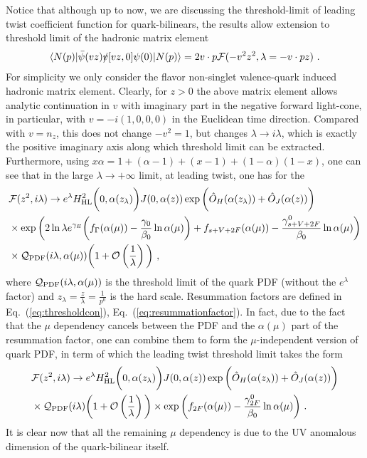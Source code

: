 \documentclass[a4paper,11pt]{article}
\begin{document}
Notice that although up to now, we are discussing the threshold-limit of leading twist coefficient function for quark-bilinears, the results allow extension to threshold limit of the hadronic matrix element~\cite{Braun:2018brg} \begin{align}
\langle N(p)|\bar \psi(vz)\slashed{v}[vz,0]\psi(0)|N(p)\rangle=2v\cdot p {\cal F}(-v^2z^2,\lambda=-v\cdot p z) \ .
\end{align}
For simplicity we only consider the flavor non-singlet valence-quark induced hadronic matrix element. Clearly, for $z>0$ the above matrix element allows analytic continuation in $v$ with imaginary part in the negative forward light-cone, in particular, with $v=-i(1,0,0,0)$ in the Euclidean time direction. Compared with $v=n_z$, this does not change $-v^2=1$, but changes $\lambda \rightarrow i\lambda$, which is exactly the positive imaginary axis along which threshold limit can be extracted. Furthermore, using $x\alpha=1+(\alpha-1)+(x-1)+(1-\alpha)(1-x)$, one can see that in the large $\lambda \rightarrow +\infty$ limit, at leading twist, one has for the 
\begin{align}
&{\cal F}(z^2,i\lambda) \rightarrow e^{\lambda}H_{\rm HL}^2\bigg(0,\alpha(z_\lambda)\bigg)J(0,\alpha(z))\exp \bigg(\hat O_H(\alpha(z_\lambda))+\hat O_J(\alpha(z))\bigg) \nonumber \\ 
& \times \exp \bigg(2\ln \lambda e^{\gamma_E}\bigg(f_{\Gamma}(\alpha(\mu))-\frac{\gamma_0}{\beta_0}\ln \alpha(\mu)\bigg)+f_{s+V+2F}(\alpha(\mu))-\frac{\gamma^0_{s+V+2F}}
{\beta_0}\ln \alpha(\mu)\bigg) \nonumber \\ 
& \times {\cal Q}_{\rm PDF}(i\lambda,\alpha(\mu))\bigg(1+{\cal O} \left(\frac{1}{\lambda}\right)\bigg) \ ,
\end{align}
where ${\cal Q}_{\rm PDF}(i\lambda,\alpha(\mu))$ is the threshold limit of the quark PDF (without the $e^{\lambda}$ factor) and $z_\lambda=\frac{z}{\lambda}=\frac{1}{p^0}$ is the hard scale. Resummation factors are defined in Eq.~(\ref{eq:thresholdcon}), Eq.~(\ref{eq:resummationfactor}). In fact, due to the fact that the $\mu$ dependency cancels between the PDF and the $\alpha(\mu)$ part of the resummation factor, one can combine them to form the $\mu$-independent version of quark PDF, in term of which the leading twist threshold limit takes the form
\begin{align}
&{\cal F}(z^2,i\lambda) \rightarrow e^{\lambda}H_{\rm HL}^2\bigg(0,\alpha(z_\lambda)\bigg)J(0,\alpha(z))\exp \bigg(\hat O_H(\alpha(z_\lambda))+\hat O_J(\alpha(z))\bigg) \nonumber \\ 
& \times  {\cal Q}_{\rm PDF}(i\lambda)\bigg(1+{\cal O} \left(\frac{1}{\lambda}\right)\bigg)\times \exp \bigg(f_{2F}(\alpha(\mu))-\frac{\gamma^0_{2F}}
{\beta_0}\ln \alpha(\mu)\bigg) \ .
\end{align}
It is clear now that all the remaining $\mu$ dependency is due to the UV anomalous dimension of the quark-bilinear itself. 
\end{document}
